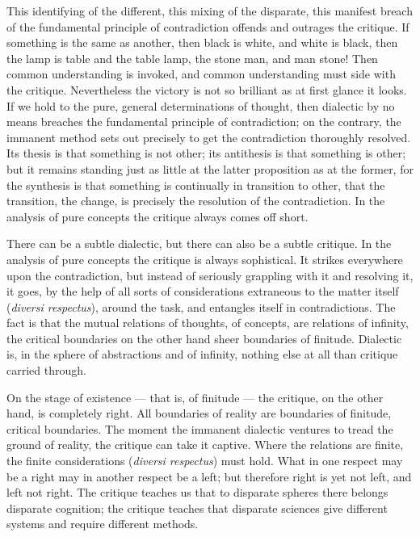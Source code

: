 \documentclass[12pt]{book}
\begin{document}
This identifying of the different, this mixing of the disparate, this manifest
breach of the fundamental principle of contradiction offends and outrages the
critique. If something is the same as another, then black is white, and white is
black, then the lamp is table and the table lamp, the stone man, and man stone!
Then common understanding is invoked, and common understanding must side with
the critique. Nevertheless the victory is not so brilliant as at first glance it
looks. If we hold to the pure, general determinations of thought, then dialectic
by no means breaches the fundamental principle of contradiction; on the
contrary, the immanent method sets out precisely to get the contradiction
thoroughly resolved. Its thesis is that something is not other; its antithesis
is that something is other; but it remains standing just as little at the latter
proposition as at the former, for the synthesis is that something is continually
in transition to other, that the transition, the change, is precisely the
resolution of the contradiction. In the analysis of pure concepts the critique
always comes off short.

There can be a subtle dialectic, but there can also be a subtle critique. In the
analysis of pure concepts the critique is always sophistical. It strikes
everywhere upon the contradiction, but instead of seriously grappling with it
and resolving it, it goes, by the help of all sorts of considerations
extraneous to the matter itself (\textit{diversi respectus}), around the task,
and entangles itself in contradictions. The fact is that the mutual relations of
thoughts, of concepts, are relations of infinity, the critical boundaries on the
other hand sheer boundaries of finitude. Dialectic is, in the sphere of
abstractions and of infinity, nothing else at all than critique carried through.

On the stage of existence --- that is, of finitude --- the critique, on the other
hand, is completely right. All boundaries of reality are boundaries of
finitude, critical boundaries. The moment the immanent dialectic ventures to
tread the ground of reality, the critique can take it captive. Where the
relations are finite, the finite considerations (\textit{diversi respectus})
must hold. What in one respect may be a right may in another respect be a left;
but therefore right is yet not left, and left not right. The critique teaches us
that to disparate spheres there belongs disparate cognition; the critique
teaches that disparate sciences give different systems and require different
methods.
\end{document}
